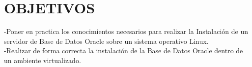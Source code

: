 \section{OBJETIVOS}
\begin{enumerate}
\vspace{12pt}
-Poner en practica los conocimientos necesarios para realizar la Instalación de un servidor de Base de Datos Oracle sobre un sistema operativo Linux.\\

-Realizar de forma correcta la instalación de la Base de Datos Oracle dentro de un ambiente virtualizado.\\


\end{enumerate}
